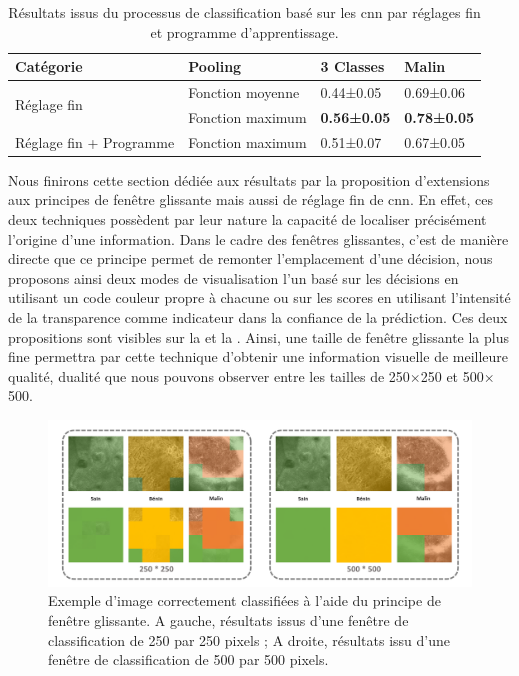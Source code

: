 \begin{table}[H]
    \centering
    \begin{tabular}{llll}
        \toprule
        Catégorie                   & Pooling           & 3 Classes         & Malin             \\ \midrule
        \multirow{2}{*}{Réglage fin}& Fonction moyenne  & 0.44±0.05         & 0.69±0.06         \\
                                    & Fonction maximum  & \textbf{0.56±0.05}& \textbf{0.78±0.05}\\
        Réglage fin + Programme     & Fonction maximum  & 0.51±0.07         & 0.67±0.05         \\
        \bottomrule
    \end{tabular}
    
    \label{tab:image_improvement_fine}
    \caption{Résultats issus du processus de classification basé sur les \gls{cnn} par réglages fin et programme d'apprentissage.}
\end{table}

Nous finirons cette section dédiée aux résultats par la proposition d'extensions aux principes de fenêtre glissante mais aussi de réglage fin de \gls{cnn}. En effet, ces deux techniques possèdent par leur nature la capacité de localiser précisément l'origine d'une information. Dans le cadre des fenêtres glissantes, c'est de manière directe que ce principe permet de remonter l'emplacement d'une décision, nous proposons ainsi deux modes de visualisation l'un basé sur les décisions en utilisant un code couleur propre à chacune ou sur les scores en utilisant l'intensité de la transparence comme indicateur dans la confiance de la prédiction. Ces deux propositions sont visibles sur la  et la . Ainsi, une taille de fenêtre glissante la plus fine permettra par cette technique d'obtenir une information visuelle de meilleure qualité, dualité que nous pouvons observer entre les tailles de 250$\times$250 et 500$\times$500.\par

\begin{figure}[H]
    \centering
    \includegraphics[width=\linewidth]{contents/chapter_5/resources/exemple_image_improvement_well.pdf}
    \caption{Exemple d'image correctement classifiées à l'aide du principe de fenêtre glissante. A gauche, résultats issus d'une fenêtre de classification de 250 par 250 pixels ; A droite, résultats issu d'une fenêtre de classification de 500 par 500 pixels.}
    \label{fig:exemple_image_improvement_well}
\end{figure}\par

